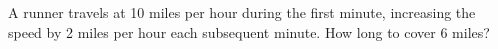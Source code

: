 A runner travels at 10 miles per hour during the first minute, increasing the speed by 2 miles per hour each subsequent minute. How long to cover 6 miles?
